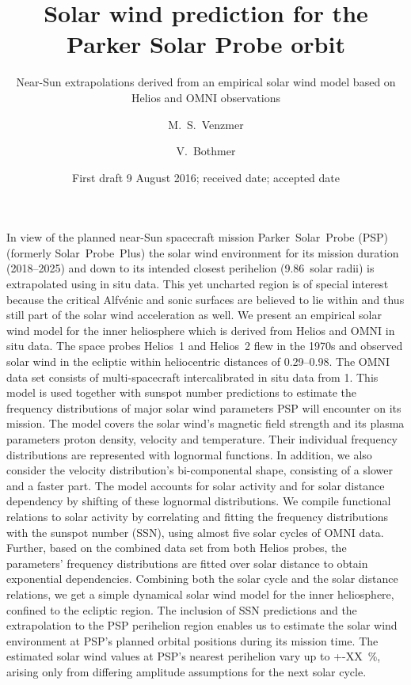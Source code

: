 
\title{Solar wind prediction for the Parker Solar Probe orbit}
\subtitle{Near-Sun extrapolations derived from an empirical solar wind model based on Helios and OMNI observations}

\author{M.~S.~Venzmer
\and V.~Bothmer}


\date{First draft 9 August 2016; received date; accepted date }

\abstract
{In view of the planned near-Sun spacecraft mission Parker~Solar~Probe (PSP) (formerly Solar~Probe~Plus) the solar wind environment for its mission duration (2018--2025) and down to its intended closest perihelion (\num{9.86}~solar radii) is extrapolated using in situ data. This yet uncharted region is of special interest because the critical Alfvénic and sonic surfaces are believed to lie within and thus still part of the solar wind acceleration as well.}	%
{We present an empirical solar wind model for the inner heliosphere which is derived from Helios and OMNI in situ data. The space probes Helios~1 and Helios~2 flew in the 1970s and observed solar wind in the ecliptic within heliocentric distances of \SIrange{0.29}{0.98}{\au}. The OMNI data set consists of multi-spacecraft intercalibrated in situ data from \SI{1}{\au}. This model is used together with sunspot number predictions to estimate the frequency distributions of major solar wind parameters PSP will encounter on its mission.}	%
{The model covers the solar wind's magnetic field strength and its plasma parameters proton density, velocity and temperature.
Their individual frequency distributions are represented with lognormal functions. In addition, we also consider the velocity distribution's bi-componental shape, consisting of a slower and a faster part. The model accounts for solar activity and for solar distance dependency by shifting of these lognormal distributions. We compile functional relations to solar activity by correlating and fitting the frequency distributions with the sunspot number (SSN), using almost five solar cycles of OMNI data. Further, based on the combined data set from both Helios probes, the parameters' frequency distributions are fitted over solar distance to obtain exponential dependencies. Combining both the solar cycle and the solar distance relations, we get a simple dynamical solar wind model for the inner heliosphere, confined to the ecliptic region.}	%
{The inclusion of SSN predictions and the extrapolation to the PSP perihelion region enables us to estimate the solar wind environment at PSP's planned orbital positions during its mission time. The estimated solar wind values at PSP's nearest perihelion vary up to +-XX~\%, arising only from differing amplitude assumptions for the next solar cycle.}	%
{}	%

